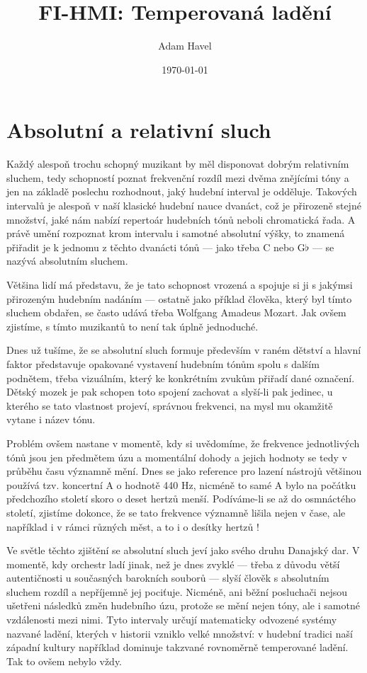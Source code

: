 \documentclass[12pt]{article}
\title{FI-HMI: Temperovaná ladění}
\date{\today}
\author{Adam Havel}
\begin{document}
\maketitle

\pagebreak

\section{Absolutní a relativní sluch}

Každý alespoň trochu schopný muzikant by měl disponovat dobrým relativním sluchem, tedy schopností poznat frekvenční rozdíl mezi dvěma znějícími tóny a jen na základě poslechu rozhodnout, jaký hudební interval je odděluje. Takových intervalů je alespoň v naší klasické hudební nauce dvanáct, což je přirozeně stejné množství, jaké nám nabízí repertoár hudebních tónů neboli chromatická řada. A právě umění rozpoznat krom intervalu i samotné absolutní výšky, to znamená přiřadit je k jednomu z těchto dvanácti tónů — jako třeba C nebo G$\flat$ — se nazývá absolutním sluchem.

Většina lidí má představu, že je tato schopnost vrozená a spojuje si ji s jakýmsi přirozeným hudebním nadáním — ostatně jako příklad člověka, který byl tímto sluchem obdařen, se často udává třeba Wolfgang Amadeus Mozart. Jak ovšem zjistíme, s tímto  muzikantů to není tak úplně jednoduché.

Dnes už tušíme, že se absolutní sluch formuje především v raném dětství a hlavní faktor představuje opakované vystavení hudebním tónům spolu s dalším podnětem, třeba vizuálním, který ke konkrétním zvukům přiřadí dané označení. Dětský mozek je pak schopen toto spojení zachovat a slyší-li pak jedinec, u kterého se tato vlastnost projeví, správnou frekvenci, na mysl mu okamžitě vytane i název tónu.

Problém ovšem nastane v momentě, kdy si uvědomíme, že frekvence jednotlivých tónů jsou jen předmětem úzu a momentální dohody a jejich hodnoty se tedy v průběhu času významně mění. Dnes se jako reference pro lazení nástrojů většinou používá tzv. koncertní A o hodnotě 440 Hz, nicméně to samé A bylo na počátku předchozího století skoro o deset hertzů menší. Podíváme-li se až do osmnáctého století, zjistíme dokonce, že se tato frekvence významně lišila nejen v čase, ale například i v rámci různých měst, a to i o desítky hertzů \cite{wiki_pitch}!

Ve světle těchto zjištění se absolutní sluch jeví jako svého druhu Danajský dar. V momentě, kdy orchestr ladí jinak, než je dnes zvyklé — třeba z důvodu větší autentičnosti u současných barokních souborů — slyší člověk s absolutním sluchem rozdíl a nepříjemně jej pociťuje. Nicméně, ani běžní posluchači nejsou ušetřeni následků změn hudebního úzu, protože se mění nejen tóny, ale i samotné vzdálenosti mezi nimi. Tyto intervaly určují matematicky odvozené systémy nazvané ladění, kterých v historii vzniklo velké množství: v hudební tradici naší západní kultury například dominuje takzvané rovnoměrně temperované ladění. Tak to ovšem nebylo vždy.
\end{document}
